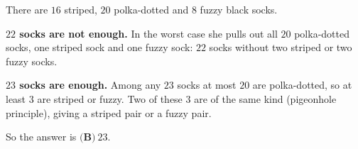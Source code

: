 There are $16$ striped, $20$ polka-dotted and $8$ fuzzy black socks.

\textbf{$22$ socks are not enough.} In the worst case she pulls out all $20$ polka-dotted socks, one striped sock and one fuzzy sock: $22$ socks without two striped or two fuzzy socks.

\textbf{$23$ socks are enough.} Among any $23$ socks at most $20$ are polka-dotted, so at least $3$ are striped or fuzzy. Two of these $3$ are of the same kind (pigeonhole principle), giving a striped pair or a fuzzy pair.

So the answer is $\boxed{\textbf{(B)}\ 23}$.
